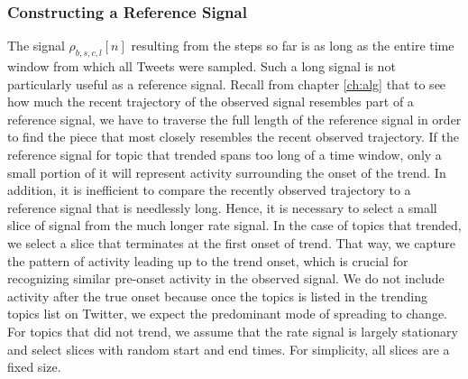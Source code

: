 \subsubsection{Constructing a Reference Signal}
The signal $\rho_{b,s,c,l}[n]$ resulting from the steps so far is as long as the
entire time window from which all Tweets were sampled. Such a long signal is not
particularly useful as a reference signal. Recall from chapter \ref{ch:alg} that
to see how much the recent trajectory of the observed signal resembles part of a
reference signal, we have to traverse the full length of the reference signal in
order to find the piece that most closely resembles the recent observed
trajectory. If the reference signal for topic that trended spans too long of a
time window, only a small portion of it will represent activity surrounding the
onset of the trend. In addition, it is inefficient to compare the recently
observed trajectory to a reference signal that is needlessly long. Hence, it is
necessary to select a small slice of signal from the much longer rate signal. In
the case of topics that trended, we select a slice that terminates at the first
onset of trend. That way, we capture the pattern of activity leading up to the
trend onset, which is crucial for recognizing similar pre-onset activity in the
observed signal. We do not include activity after the true onset because once
the topics is listed in the trending topics list on Twitter, we expect the
predominant mode of spreading to change. For topics that did not trend, we
assume that the rate signal is largely stationary and select slices with random
start and end times. For simplicity, all slices are a fixed size.

